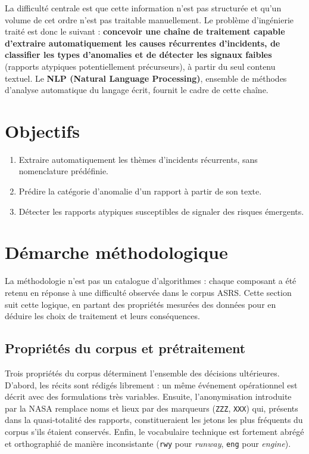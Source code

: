 \documentclass[11pt,a4paper]{article}
\begin{document}
La difficulté centrale est que cette information n'est pas structurée et qu'un volume de cet
ordre n'est pas traitable manuellement. Le problème d'ingénierie traité est donc le suivant :
\textbf{concevoir une chaîne de traitement capable d'extraire automatiquement les causes
récurrentes d'incidents, de classifier les types d'anomalies et de détecter les signaux
faibles} (rapports atypiques potentiellement précurseurs), à partir du seul contenu textuel.
Le \textbf{NLP (Natural Language Processing)}, ensemble de méthodes d'analyse automatique du
langage écrit, fournit le cadre de cette chaîne.

\section{Objectifs}

\begin{enumerate}[leftmargin=1.5em]
  \item Extraire automatiquement les thèmes d'incidents récurrents, sans nomenclature
  prédéfinie.
  \item Prédire la catégorie d'anomalie d'un rapport à partir de son texte.
  \item Détecter les rapports atypiques susceptibles de signaler des risques émergents.
\end{enumerate}

\section{Démarche méthodologique}

La méthodologie n'est pas un catalogue d'algorithmes : chaque composant a été retenu en
réponse à une difficulté observée dans le corpus ASRS. Cette section suit cette logique, en
partant des propriétés mesurées des données pour en déduire les choix de traitement et leurs
conséquences.

\subsection{Propriétés du corpus et prétraitement}
Trois propriétés du corpus déterminent l'ensemble des décisions ultérieures. D'abord, les
récits sont rédigés librement : un même événement opérationnel est décrit avec des
formulations très variables. Ensuite, l'anonymisation introduite par la NASA remplace noms et
lieux par des marqueurs (\texttt{ZZZ}, \texttt{XXX}) qui, présents dans la quasi-totalité des
rapports, constitueraient les jetons les plus fréquents du corpus s'ils étaient conservés.
Enfin, le vocabulaire technique est fortement abrégé et orthographié de manière inconsistante
(\texttt{rwy} pour \emph{runway}, \texttt{eng} pour \emph{engine}).
\end{document}
